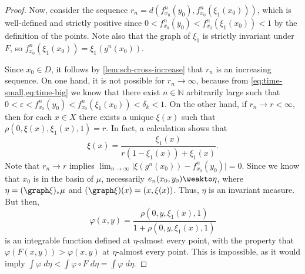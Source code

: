 \documentclass[../main.tex]{subfiles}
\begin{document}
\begin{proof}
  Now, consider the sequence \(r_n = d(f_{x_0}^n(y_0), f_{x_0}^n(\xi_1(x_0)))\), which is well-defined and strictly positive since \(0 < f_{x_0}^n(y_0) < f_{x_0}^n(\xi_1(x_0)) < 1\) by the definition of the points. Note also that the graph of \(\xi_1\) is strictly invariant under \(F\), so \(f_{x_0}^n(\xi_1(x_0)) = \xi_1(g^n(x_0))\).

  Since \(x_0 \in D\), it follows by \cref{lem:sch-cross-increase} that \(r_n\) is an increasing sequence. On one hand, it is not possible for \(r_n \to \infty\), because from \cref{eq:time-small,eq:time-big} we know that there exist \(n \in \mathbb{N}\) arbitrarily large such that \(0 < \varepsilon < f^n_{x_0}(y_0) < f^n_{x_0}(\xi_1(x_0)) < \delta_k < 1\). On the other hand, if \(r_n \to r < \infty\), then for each \(x \in X\) there exists a unique \(\xi(x)\) such that \(\rho(0, \xi(x), \xi_1(x), 1) = r\). In fact, a calculation shows that
  \begin{equation*}
    \xi(x) = \frac{\xi_1(x)}{r(1 - \xi_1(x)) + \xi_1(x)}.
  \end{equation*}
  Note that \(r_n \to r\) implies \(\lim_{n \to \infty} \lvert \xi(g^n(x_0)) - f_{x_0}^n(y_0) \rvert = 0\). Since we know that \(x_0\) is in the basin of \(\mu\), necessarily \(e_n(x_0,y_0)\weakto \eta\), where \(\eta = (\graph \xi)_* \mu\) and \((\graph \xi)(x) = (x, \xi(x))\). Thus, \(\eta\) is an invariant measure. But then,
  \[\varphi(x,y) = \frac{\rho(0, y, \xi_1(x), 1)}{1 + \rho(0, y, \xi_1(x), 1)}\]
  is an integrable function defined at \(\eta\)-almost every point, with the property that \(\varphi(F(x,y)) > \varphi(x,y)\) at \(\eta\)-almost every point. This is impossible, as it would imply \(\int \varphi \;d \eta < \int \varphi \circ F \;d\eta = \int \varphi \;d\eta\).
\end{proof}
\end{document}
